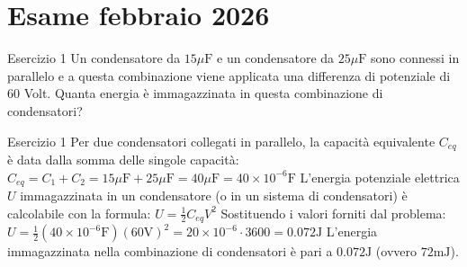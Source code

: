 \documentclass[a4paper]{article}
\begin{document}
\section{Esame febbraio 2026}
\begin{snippetexercise}{Esercizio 1}
    Un condensatore da \(15 \mu\mathrm{F}\) e un condensatore da \(25 \mu\mathrm{F}\)
    sono connessi in parallelo e a questa combinazione viene applicata una differenza di potenziale di 60 Volt.
    Quanta energia è immagazzinata in questa combinazione di condensatori?
\end{snippetexercise}
\begin{snippetsolution}{Esercizio 1}
    Per due condensatori collegati in parallelo, la capacità equivalente \(C_{eq}\) è data dalla somma delle singole capacità:
    \(C_{eq} = C_1 + C_2 = 15 \mu\mathrm{F} + 25 \mu\mathrm{F} = 40 \mu\mathrm{F} = 40 \times 10^{-6} \mathrm{F}\)
    L'energia potenziale elettrica \(U\) immagazzinata in un condensatore (o in un sistema di condensatori) è calcolabile con la formula:
    \(U = \frac{1}{2} C_{eq} V^2\)
    Sostituendo i valori forniti dal problema:
    \(U = \frac{1}{2} (40 \times 10^{-6} \mathrm{F}) (60 \mathrm{V})^2 = 20 \times 10^{-6} \cdot 3600 = 0.072 \mathrm{J}\)
    L'energia immagazzinata nella combinazione di condensatori è pari a \(0.072 \mathrm{J}\) (ovvero \(72 \mathrm{mJ}\)).
\end{snippetsolution}
\end{document}
